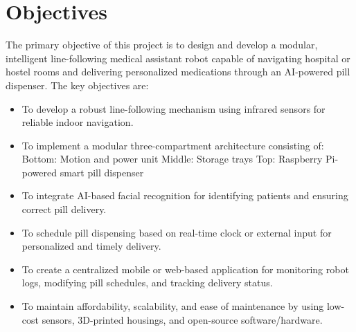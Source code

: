 \vspace{1.5\baselineskip} 

\section{Objectives}
The primary objective of this project is to design and develop a modular, intelligent line-following medical assistant robot capable of navigating hospital or hostel rooms and delivering personalized medications through an AI-powered pill dispenser. The key objectives are:
\begin{itemize}
    
    \item To develop a robust line-following mechanism using infrared sensors for reliable indoor navigation.
    \item To implement a modular three-compartment architecture consisting of:
    \subitem Bottom: Motion and power unit
    \subitem Middle: Storage trays
    \subitem Top: Raspberry Pi-powered smart pill dispenser
    \item To integrate AI-based facial recognition for identifying patients and ensuring correct pill delivery.
    \item To schedule pill dispensing based on real-time clock or external input for personalized and timely delivery.
    \item To create a centralized mobile or web-based application for monitoring robot logs, modifying pill schedules, and tracking delivery status.
    \item To maintain affordability, scalability, and ease of maintenance by using low-cost sensors, 3D-printed housings, and open-source software/hardware.
\end{itemize}

\vspace{1.5\baselineskip} 

